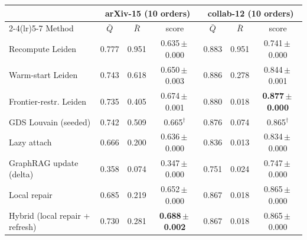\begin{tabular}{l ccc ccc}
\toprule
 & \multicolumn{3}{c}{arXiv-15 (10 orders)} & \multicolumn{3}{c}{collab-12 (10 orders)}\\
\cmidrule(lr){2-4}\cmidrule(lr){5-7}
Method & $\bar Q$ & $\bar R$ & score & $\bar Q$ & $\bar R$ & score\\
\midrule
Recompute Leiden & 0.777 & 0.951 & 0.635\,$\pm$\,0.000 & 0.883 & 0.951 & 0.741\,$\pm$\,0.000 \\
Warm-start Leiden & 0.743 & 0.618 & 0.650\,$\pm$\,0.003 & 0.886 & 0.278 & 0.844\,$\pm$\,0.001 \\
Frontier-restr. Leiden & 0.735 & 0.405 & 0.674\,$\pm$\,0.001 & 0.880 & 0.018 & \textbf{0.877\,$\pm$\,0.000} \\
GDS Louvain (seeded) & 0.742 & 0.509 & 0.665$^\dagger$ & 0.876 & 0.074 & 0.865$^\dagger$ \\
Lazy attach & 0.666 & 0.200 & 0.636\,$\pm$\,0.000 & 0.836 & 0.013 & 0.834\,$\pm$\,0.000 \\
\midrule
GraphRAG update (delta) & 0.358 & 0.074 & 0.347\,$\pm$\,0.000 & 0.751 & 0.024 & 0.747\,$\pm$\,0.000 \\
Local repair & 0.685 & 0.219 & 0.652\,$\pm$\,0.000 & 0.867 & 0.018 & 0.865\,$\pm$\,0.000 \\
Hybrid (local repair + refresh) & 0.730 & 0.281 & \textbf{0.688\,$\pm$\,0.002} & 0.867 & 0.018 & 0.865\,$\pm$\,0.000 \\
\bottomrule
\end{tabular}
